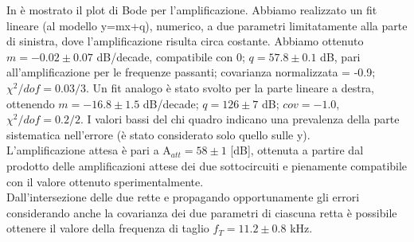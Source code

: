 In  è mostrato il plot di Bode per l'amplificazione. Abbiamo realizzato un fit lineare (al modello y=mx+q), numerico, a due parametri limitatamente alla parte di sinistra, dove l'amplificazione risulta circa costante. Abbiamo ottenuto $m = -0.02 \pm 0.07$ dB/decade, compatibile con 0; $q = 57.8 \pm 0.1$ dB, pari all'amplificazione per le frequenze passanti; covarianza normalizzata = -0.9; $ \chi ^2/dof = 0.03/3$. Un fit analogo è stato svolto per la parte lineare a destra, ottenendo $m = -16.8 \pm 1.5$ dB/decade; $q = 126 \pm 7$ dB; $cov = -1.0$, $ \chi ^2/dof = 0.2/2$. I valori bassi del chi quadro indicano una prevalenza della parte sistematica nell'errore (è stato considerato solo quello sulle y).\\
L'amplificazione attesa è pari a A$_{att} = 58 \pm 1$ [dB], ottenuta a partire dal prodotto delle amplificazioni attese dei due sottocircuiti e pienamente compatibile con il valore ottenuto sperimentalmente.\\
Dall'intersezione delle due rette e propagando opportunamente gli errori considerando anche la covarianza dei due parametri di ciascuna retta è possibile ottenere il valore della frequenza di taglio $f_T = 11.2 \pm 0.8$ kHz.

